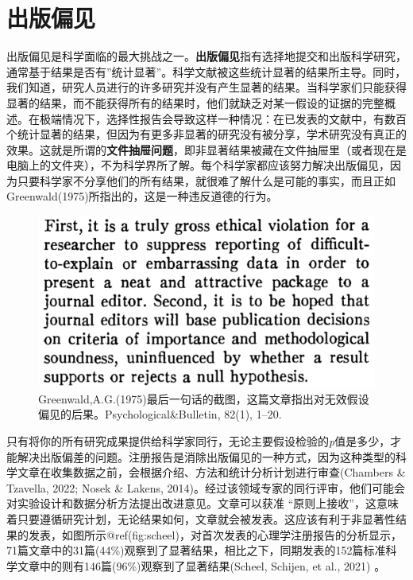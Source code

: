 \documentclass[
  letterpaper,
  DIV=11,
  numbers=noendperiod]{scrreprt}
\begin{document}
\hypertarget{publicationbias}{%
\section{出版偏见}\label{publicationbias}}

出版偏见是科学面临的最大挑战之一。\textbf{出版偏见}指有选择地提交和出版科学研究，通常基于结果是否有''统计显著''。科学文献被这些统计显著的结果所主导。同时，我们知道，研究人员进行的许多研究并没有产生显著的结果。当科学家们只能获得显著的结果，而不能获得所有的结果时，他们就缺乏对某一假设的证据的完整概述。在极端情况下，选择性报告会导致这样一种情况：在已发表的文献中，有数百个统计显著的结果，但因为有更多非显著的研究没有被分享，学术研究没有真正的效果。这就是所谓的\textbf{文件抽屉问题}，即非显著结果被藏在文件抽屉里（或者现在是电脑上的文件夹），不为科学界所了解。每个科学家都应该努力解决出版偏见，因为只要科学家不分享他们的所有结果，就很难了解什么是可能的事实，而且正如Greenwald(1975)所指出的，这是一种违反道德的行为。

\begin{figure}

{\centering \includegraphics[width=1\textwidth,height=\textheight]{images/greenwald.png}

}

\caption{\label{fig-greenwald}Greenwald,A.G.(1975)最后一句话的截图，这篇文章指出对无效假设偏见的后果。Psychological\&Bulletin,
82(1), 1--20.}

\end{figure}

只有将你的所有研究成果提供给科学家同行，无论主要假设检验的\emph{p}值是多少，才能解决出版偏差的问题。注册报告是消除出版偏见的一种方式，因为这种类型的科学文章在收集数据之前，会根据介绍、方法和统计分析计划进行审查(Chambers
\& Tzavella, 2022; Nosek \& Lakens,
2014)。经过该领域专家的同行评审，他们可能会对实验设计和数据分析方法提出改进意见。文章可以获准
``原则上接收''，这意味着只要遵循研究计划，无论结果如何，文章就会被发表。这应该有利于非显著性结果的发表，如图所示@ref(fig:scheel)，对首次发表的心理学注册报告的分析显示，71篇文章中的31篇(44\%)观察到了显著结果，相比之下，同期发表的152篇标准科学文章中的则有146篇(96\%)观察到了显著结果(Scheel,
Schijen, et al., 2021) 。
\end{document}
